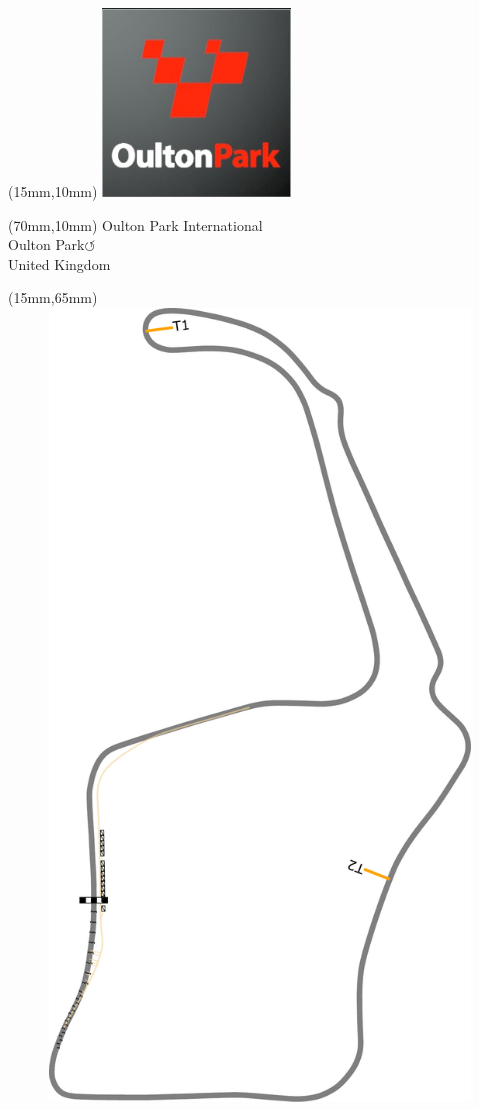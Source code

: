 \null\newpage
\begin{textblock*}{50mm}(15mm,10mm)%
\includegraphics[width=50mm]{LG/2015-05-20_00091.png}
\end{textblock*}
\begin{textblock*}{130mm}(70mm,10mm)%
{\fontsize{20}{20}\selectfont Oulton Park International\\}
{\fontsize{16}{16}\selectfont Oulton Park\hfill \huge$\circlearrowleft$\\}
{\fontsize{12}{12}\selectfont United Kingdom\\}
\end{textblock*}
\begin{textblock*}{185mm}(15mm,65mm)%
\centering
\mbox{\includegraphics[width=185mm,height=210mm,keepaspectratio]{PT/OUPAIN.pdf}}
\end{textblock*}
